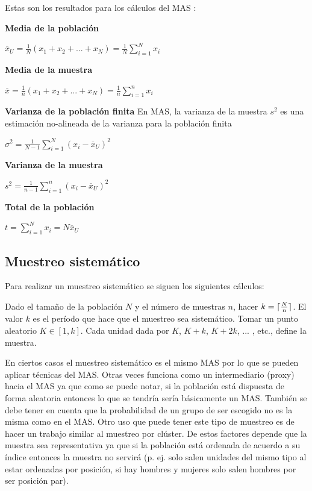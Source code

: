 \documentclass{report}
\DeclarePairedDelimiter{\ceil}{\lceil}{\rceil}
\begin{document}
\bigbreak

Estas son los resultados para los cálculos del MAS \cite{thompson-2012}:

\bigbreak
\textbf{Media de la población}

\bigbreak

$\overline{x}_U = \frac{1}{N}(x_1 + x_2 + ... + x_N) = \frac{1}{N} \sum_{i=1}^N x_i$


\bigbreak
\textbf{Media de la muestra}

\bigbreak

$\overline{x} = \frac{1}{n}(x_1 + x_2 + ... + x_N) = \frac{1}{n} \sum_{i=1}^n x_i$


\bigbreak
\textbf{Varianza de la población finita} En MAS, la varianza de la muestra $s^2$ es una estimación no-alineada de la varianza para la población finita

\bigbreak

$\sigma ^2 = \frac{1}{N-1} \sum_{i=1}^{N} (x_i - \overline{x}_U)^2$


\bigbreak
\textbf{Varianza de la muestra}

\bigbreak

$s^2 = \frac{1}{n-1} \sum_{i=1}^n (x_i - \overline{x}_U)^2$


\bigbreak
\textbf{Total de la población}

\bigbreak

$t = \sum_{i=1}^N x_i = N \overline{x}_U$


\subsection{Muestreo sistemático}

Para realizar un muestreo sistemático se siguen los siguientes cálculos:

\bigbreak

Dado el tamaño de la población $N$ y el número de muestras $n$, hacer $k=\ceil{\frac{N}{n}}$. El valor $k$ es el período que hace que el muestreo sea sistemático. Tomar un punto aleatorio $K \in [1, k]$. Cada unidad dada por $K$, $K + k$, $K + 2k$, ... , etc., define la muestra.

\bigbreak

En ciertos casos el muestreo sistemático es el mismo MAS por lo que se pueden aplicar técnicas del MAS. Otras veces funciona como un intermediario (proxy) hacia el MAS ya que como se puede notar, si la población está dispuesta de forma aleatoria entonces lo que se tendría sería básicamente un MAS. También se debe tener en cuenta que la probabilidad de un grupo de ser escogido no es la misma como en el MAS. Otro uso que puede tener este tipo de muestreo es de hacer un trabajo similar al muestreo por clúster. De estos factores depende que la muestra sea representativa ya que si la población está ordenada de acuerdo a su índice entonces la muestra no servirá (p. ej. solo salen unidades del mismo tipo al estar ordenadas por posición, si hay hombres y mujeres solo salen hombres por ser posición par). 
\end{document}
